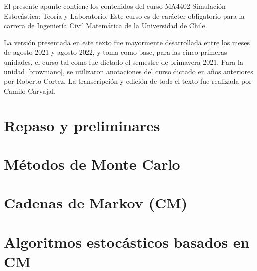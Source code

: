 \documentclass[letterpaper,11pt]{article} %
\theoremstyle{defbreak}
\theoremstyle{propbreak}
\theoremstyle{remark}
\theoremstyle{break}
\begin{document}
	



El presente apunte contiene los contenidos del curso MA4402 Simulación Estocástica: Teoría y Laboratorio. Este curso es de carácter obligatorio para la carrera de Ingeniería Civil Matemática de la Universidad de Chile.

\newp La versión presentada en este texto fue mayormente desarrollada entre los meses de agosto 2021 y agosto 2022, y toma como base, para las cinco primeras unidades, el curso tal como fue dictado el semestre de primavera 2021. Para la unidad \ref{browniano}, se utilizaron anotaciones del curso dictado en años anteriores por Roberto Cortez. La transcripción y edición de todo el texto fue realizada por Camilo Carvajal. 

\newpage




\section{Repaso y preliminares}


\newpage
\section{Métodos de Monte Carlo}



\newpage
\section{Cadenas de Markov (CM)}


\newpage
\section{Algoritmos estocásticos basados en CM}


\newpage
\end{document}
